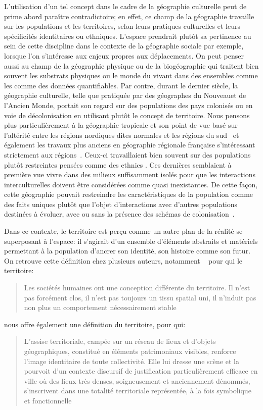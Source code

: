 L'utilisation d'un tel concept dans le cadre de la géographie culturelle peut de prime abord paraître contradictoire; en effet, ce champ de la géographie travaille  sur les populations et les territoires, selon leurs pratiques culturelles et leurs spécificités identitaires ou ethniques. 
L'espace prendrait plutôt sa pertinence au sein de cette discipline dans le contexte de la géographie sociale par exemple, lorsque l'on s'intéresse aux enjeux propres aux déplacements.
On peut penser aussi au champ de la géographie physique ou de la biogéographie qui traitent bien souvent les substrats physiques ou le monde du vivant dans des ensembles comme les  comme des données quantifiables. 
Par contre, durant le dernier siècle, la géographie culturelle, telle que pratiquée par des géographes du Nouveau\missref et de l'Ancien Monde\missref, portait son regard sur des populations des pays colonisés ou en voie de décolonisation en utilisant plutôt le concept de territoire. 
Nous pensons plus particulièrement à la géographie tropicale et son point de vue basé sur l'altérité entre les régions nordiques dites normales et les régions du sud~\citep[493]{Power2009} et également les travaux plus anciens en géographie régionale française s'intéressant strictement aux régions~\citep[31]{Courville1991}. 
Ceux-ci travaillaient bien souvent sur des populations plutôt restreintes pensées comme des ethnies .
Ces dernières semblaient à première vue vivre dans des milieux suffisamment isolés pour que les interactions interculturelles doivent être considérées comme quasi inexistantes. 
De cette façon, cette géographie pouvait restreindre les caractéristiques de la population comme des faits uniques plutôt que l'objet d'interactions avec d'autres populations destinées à évoluer, avec ou sans la présence des schémas de colonisation~\citep[79--80]{DiMeo2007}.

Dans ce contexte, le territoire est perçu comme un autre plan de la réalité se superposant à l'espace: il s'agirait d'un ensemble d'éléments abstraits et matériels permettant à la population d'ancrer son identité, son histoire comme son futur. 
On retrouve cette définition chez plusieurs auteurs, notamment ~\citeauthor{Bonnemaison1981} pour qui le territoire:
\blockquote[{\cite[253]{Bonnemaison1981}}][.]{Les sociétés humaines ont une conception différente du territoire. Il n'est pas forcément clos, il n'est pas toujours un tissu spatial uni, il n'induit pas non plus un comportement nécessairement stable}. 
\citeauthor{DiMeo2007} nous offre également une définition du territoire, pour qui:
\blockquote[{\cite[76]{DiMeo2007}}][.]{L’assise territoriale, campée sur un réseau de lieux et d’objets géographiques, constitué en éléments patrimoniaux visibles, renforce l’image identitaire de toute collectivité. Elle lui dresse une scène et la pourvoit d’un contexte discursif de justification particulièrement efficace en ville où des lieux très denses, soigneusement et anciennement dénommés, s’inscrivent dans une totalité territoriale représentée, à la fois symbolique et fonctionnelle}. 

